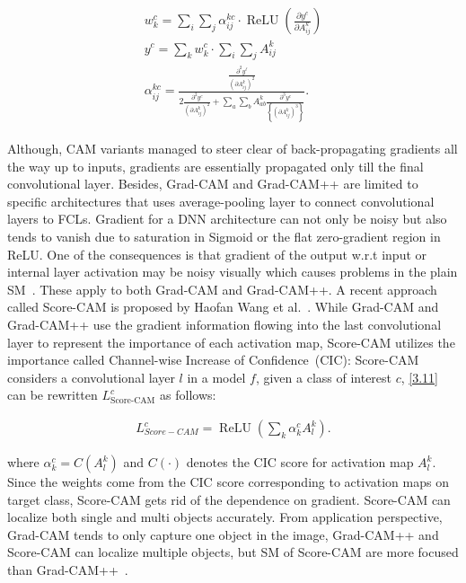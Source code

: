 \vspace{-4mm}
\begin{align}
    \begin{aligned}
        w_{k}^{c}=\sum_{i} \sum_{j} \alpha_{i j}^{k c} \cdot \operatorname{ReLU}\left(\frac{\partial y^{c}}{\partial A_{i j}^{k}}\right) \\
        y^{c}=\sum_{k} w_{k}^{c} \cdot \sum_{i} \sum_{j} A_{i j}^{k} \\
        \alpha_{i j}^{k c}=\frac{\frac{\partial^{2} y^{\ell}}{\left(\partial A_{i j}^{k}\right)^{2}}}{2 \frac{\partial^{2} y^{c}}{\left(\partial A_{i j}^{k}\right)^{2}}+\sum_{a} \sum_{b} A_{a b}^{k} \frac{\partial^{3} y^{c}}{\left\{\left(\partial A_{i j}^{k}\right)^{3}\right\}}}.
    \end{aligned}
\end{align}

\hspace*{3.5mm} Although, CAM variants managed to steer clear of back-propagating gradients all the way up to inputs, gradients are essentially propagated only till the final convolutional layer. Besides, Grad-CAM and Grad-CAM++ are limited to specific architectures that uses average-pooling layer to connect convolutional layers to FCLs. Gradient for a DNN architecture can not only be noisy but also tends to vanish due to saturation in Sigmoid or the flat zero-gradient region in ReLU. One of the consequences is that gradient of the output w.r.t input or internal layer activation may be noisy visually which causes problems in the plain SM~\cite{wang2020score}. 
\hspace*{3.5mm} These apply to both Grad-CAM and Grad-CAM++. A recent approach called Score-CAM is proposed by Haofan Wang et al.~\cite{wang2020score}. While Grad-CAM and Grad-CAM++ use the gradient information flowing into the last convolutional layer to represent the importance of each activation map, Score-CAM utilizes the importance called Channel-wise Increase of Confidence~(CIC): Score-CAM considers a convolutional layer $l$ in a model $f$, given a class of interest $c$, \cref{3.11} can be rewritten $L_{\text {Score-CAM}}^{c}$ as follows: 

\vspace{-4mm}
\begin{align}
    L_{S c o r e-C A M}^{c}=\operatorname{ReLU}\left(\sum_{k} \alpha_{k}^{c} A_{l}^{k}\right).
\end{align}
\vspace{-4mm}

\hspace*{3.5mm} where $\alpha_{k}^{c}=C\left(A_{l}^{k}\right)$ and  $C(\cdot)$ denotes the CIC score for activation map $A_{l}^{k}$. Since the weights come from the CIC score corresponding to activation maps on target class, Score-CAM gets rid of the dependence on gradient. Score-CAM can localize both single and multi objects accurately. From application perspective, Grad-CAM tends to only capture one object in the image, Grad-CAM++ and Score-CAM can localize multiple objects, but SM of Score-CAM are more focused than Grad-CAM++~\cite{wang2020score}.


